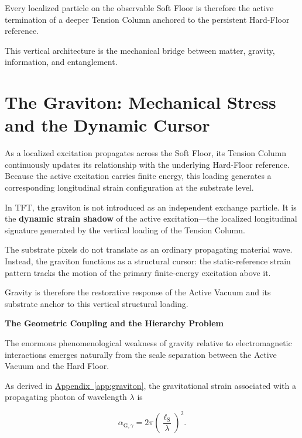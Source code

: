 Every localized particle on the observable Soft Floor is therefore the active termination of a deeper Tension Column anchored to the persistent Hard-Floor reference.

This vertical architecture is the mechanical bridge between matter, gravity, information, and entanglement.

\section{The Graviton: Mechanical Stress and the Dynamic Cursor}
\label{sec:the_graviton}

As a localized excitation propagates across the Soft Floor, its Tension Column continuously updates its relationship with the underlying Hard-Floor reference. Because the active excitation carries finite energy, this loading generates a corresponding longitudinal strain configuration at the substrate level.

In TFT, the graviton is not introduced as an independent exchange particle. It is the \textbf{dynamic strain shadow} of the active excitation---the localized longitudinal signature generated by the vertical loading of the Tension Column.

The substrate pixels do not translate as an ordinary propagating material wave. Instead, the graviton functions as a structural cursor: the static-reference strain pattern tracks the motion of the primary finite-energy excitation above it.

Gravity is therefore the restorative response of the Active Vacuum and its substrate anchor to this vertical structural loading.

\vspace{0.5em}
\noindent\textbf{The Geometric Coupling and the Hierarchy Problem}

\noindent The enormous phenomenological weakness of gravity relative to electromagnetic interactions emerges naturally from the scale separation between the Active Vacuum and the Hard Floor.

As derived in \hyperref[app:graviton]{Appendix~\ref*{app:graviton}}, the gravitational strain associated with a propagating photon of wavelength $\lambda$ is

\begin{equation}
    \alpha_{\mathrm{G},\gamma}
    =
    2\pi
    \left(
        \frac{\ell_{\mathrm S}}{\lambda}
    \right)^2.
    \label{eq:strain_coupling}
\end{equation}

